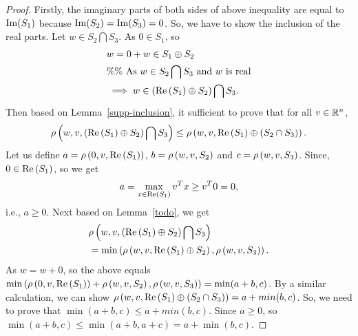 \begin{proof}
Firstly, the imaginary parts of both sides of above inequality are
equal to $\operatorname{Im}(S_1)$ because $\operatorname{Im}(S_2)=\operatorname{Im}(S_3)=0$. So, we have to
show the inclusion of the real parts.  Let $w\in S_2\bigcap S_3 $.
As $0\in S_1$, so
%
\begin{align*}
  & w=0+w\in S_1\oplus S_2\\
  & \%\%~\text{As $w\in S_2\bigcap S_3$ and $w$ is real}\\  
  & \implies w\in \left(\operatorname{Re}\left(S_1\right)\oplus
  S_2\right)\bigcap S_3.
\end{align*}
%
Then based on
Lemma~\ref{supp-inclusion}, it sufficient to prove that for all
$v\in\mathbb{R}^n$, $$\rho\left(w,v,\left(\operatorname{Re}\left(S_1\right)\oplus
  S_2\right)\bigcap S_3\right)\leq
\rho\left(w,v,\operatorname{Re}\left(S_1\right)\oplus\left(S_2\cap S_3\right)\right).$$ Let us
define $a = \rho\left(0,v,\operatorname{Re}\left(S_1\right)\right)$, $b=\rho\left(w,v,S_2\right)$
and $c = \rho\left(w,v,S_3\right)$.  Since, $0\in\operatorname{Re}\left(S_1\right)$, so we get
%
\[
a=\max_{x\in\operatorname{Re}\left(S_1\right)}v^Tx\geq v^T0 =0,
\]
%
i.e., $a\geq 0$.
Next based on Lemma~\ref{todo}, we get
%
\begin{align*}
& \rho\left(w,v,\left(\operatorname{Re}\left(S_1\right)\oplus S_2\right)\bigcap
  S_3\right)\\
& = \min\left(\rho\left(w,v,\operatorname{Re}\left(S_1\right)\oplus
    S_2\right),\rho\left(w,v,S_3\right)\right).
\end{align*}
%
As $w=w+0$, so the above equals
$\min\left(\rho\left(0,v,\operatorname{Re}\left(S_1\right)\right)+\rho\left(w,v,S_2\right),\rho\left(w,v,S_3\right)\right)
= \min(a+b,c)$.  By a similar calculation, we can show
$\rho\left(w,v,\operatorname{Re}\left(S_1\right)\oplus\left(S_2\cap S_3\right)\right) =
a+min(b,c)$.  So, we need to prove that $\min(a+b,c)\leq a+min(b,c)$.
Since $a\geq 0$, so $\min(a+b,c)\leq \min(a+b,a+c) =
a+\min(b,c)$.
\end{proof}
